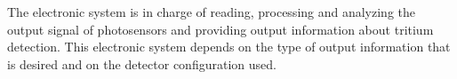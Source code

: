 The electronic system is in charge of reading, processing and analyzing the output signal of photosensors and providing output information about tritium detection. This electronic system depends on the type of output information that is desired and on the detector configuration used.


 